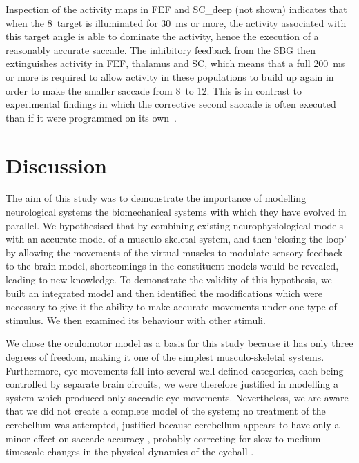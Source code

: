 \documentclass{frontiersSCNS}
\begin{document}
Inspection of the activity maps in FEF and SC\_deep (not shown)
indicates that when the 8\dg~target is illuminated for 30~ms or more,
the activity associated with this target angle is able to dominate the
activity, hence the execution of a reasonably accurate saccade. The
inhibitory feedback from the SBG then extinguishes activity in FEF,
thalamus and SC, which means that a full 200~ms or more is required to
allow activity in these populations to build up again in order to make
the smaller saccade from 8\dg~to 12\dg. This is in contrast to
experimental findings in which the corrective second saccade is often
executed  than if it were programmed on its
own~\citep{becker_analysis_1979}.


\section{Discussion} \label{sec:discussion}

The aim of this study was to demonstrate the importance of modelling
neurological systems  the biomechanical systems
with which they have evolved in parallel. We hypothesised that by
combining existing neurophysiological models with an accurate model of
a musculo-skeletal system, and then `closing the loop' by allowing the
movements of the virtual muscles to modulate sensory feedback to the
brain model, shortcomings in the constituent models would be revealed,
leading to new knowledge. To demonstrate the validity of this
hypothesis, we built an integrated model and then identified the
modifications which were necessary to give it the ability to make
accurate movements under one type of stimulus. We then examined its
behaviour with other stimuli.

We chose the oculomotor model as a basis for this study because it has
only three degrees of freedom, making it one of the simplest
musculo-skeletal systems. Furthermore, eye movements fall into several
well-defined categories, each being controlled by separate brain
circuits, we were therefore justified in modelling a system which
produced only saccadic eye movements. Nevertheless, we are aware that
we did not create a complete model of the system; no treatment of the
cerebellum was attempted, justified because cerebellum appears to have
only a minor effect on saccade accuracy \citep{dean_adaptive_2008},
probably correcting for slow to medium timescale changes in the
physical dynamics of the eyeball \citep{dean_learning_1994}.
\end{document}
